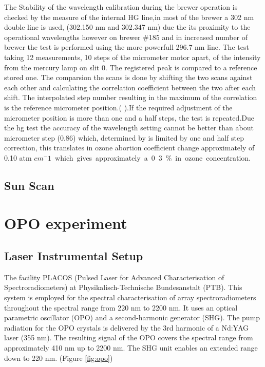 \documentclass[acp]{copernicus} %
\begin{document}
   The Stability of the wavelength calibration during the brewer operation  is checked by the measure of the internal HG line,in most of the brewer a 302 \unit{nm} double line is used, (302.150 nm and 302.347 nm) due the its proximity to the operational wavelengths however on brewer \#185 and in increased number of brewer the test is  performed using the more powerfull 296.7 \unit{nm} line. The test taking 12 measurements, 10 steps of the micrometer motor apart, of the intensity from the mercury lamp on slit 0. The registered peak is compared to a reference stored one. The comparsion the scans is done by shifting the two scans against each other and calculating the correlation coefficient between the two after each shift. The interpolated step number resulting in the maximum of the correlation is the reference micrometer position.(\citep{savastiouk2005improvements} ).If the required adjustment of the micrometer position is more than one and a half steps,  the test is repeated.Due the hg test the accuracy of the wavelength setting cannot be better than about micrometer step (0.86) which, determined by is limited by one and half step correction, this translates in ozone abortion coefficient change approximately of 0.10 \unit{atm $cm^-1$}  which gives approximately a  0.3\% in ozone concentration.
  


\subsection{Sun Scan}
\citet{savastiouk2005improvements} 


\section{ OPO experiment}

\subsection{Laser Instrumental Setup}

The facility PLACOS (Pulsed Laser for Advanced Characterisation of Spectroradiometers) at Physikalisch-Technische Bundesanstalt (PTB). This system is employed for the spectral characterisation of array spectroradiometers throughout the spectral range from 220 \unit{nm} to 2200 \unit{nm}. It uses an optical parametric oscillator (OPO) and a second-harmonic generator (SHG). The pump radiation for the OPO crystals is delivered by the 3rd harmonic of a Nd:YAG laser (355 \unit{nm}). The resulting signal of the OPO covers the spectral range from approximately 410 \unit{nm} up to 2200 \unit{nm}. The SHG unit enables an extended range down to 220 \unit{nm}.  (Figure \ref{fig:opo})
\end{document}

